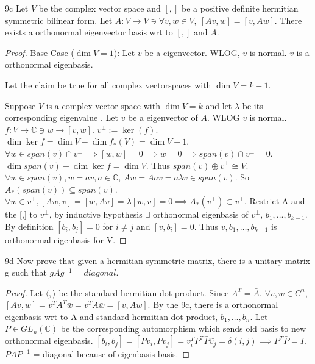 \documentclass{article}
\newcommand{\C}{\mathbb{C}}
\newcommand{\angles}[1]{\langle #1 \rangle}
\begin{document}
\begin{claim}{9c}\label{Claim 9c.}
    Let $V$ be the complex vector space and $[,]$ be a positive definite hermitian symmetric bilinear form. Let $A: V \to V \ni \forall v, w \in V,~ [Av, w] = [v, Aw]$. There exists a orthonormal eigenvector basis wrt to $[ , ]$ and $A$.     
\end{claim}
\begin{proof}
    Base Case ($\dim V = 1$): Let $v$ be a eigenvector. WLOG, $v$ is normal. $v$ is a orthonormal eigenbasis.
    
    Let the claim be true for all complex vectorspaces with $\dim V = k - 1$. 
    
    Suppose $V$ is a complex vector space with $\dim V = k$ and let $\lambda$ be its corresponding eigenvalue . Let $v$ be a eigenvector of $A$. WLOG $v$ is normal. $f : V \to \C \ni w \to [v, w]$. $v^\perp := \ker(f)$. $\dim \ker f = \dim V - \dim f_*(V) = \dim V - 1$. $\forall w \in span(v) \cap v^\perp \implies [w, w] = 0 \implies w = 0 \implies span(v) \cap v^\perp = 0$. $\dim span(v) + \dim \ker f = \dim V$. Thus $span(v) \oplus v^\perp \cong V$. $\forall w \in span(v), w = av, a \in \C$, $Aw = Aav = a\lambda v \in span(v)$. So $A_*(span(v)) \subseteq span(v)$. $\forall w \in v^\perp, [Aw, v] = [w, Av] = \lambda[w, v] = 0 \implies A_*(v^\perp) \subset v^\perp$. Restrict A and the [,] to $v^\perp$, by inductive hypothesis $\exists$ orthonormal eigenbasis of $v^\perp$, $b_1, \dots, b_{k - 1}$. By definition $[b_i, b_j] = 0$ for $i \neq j$ and $[v, b_i] = 0$. Thus $v, b_1, \dots, b_{k - 1}$ is orthonormal eigenbasis for V.            
\end{proof}

\begin{claim}{9d}\label{Claim 9d.}
    Now prove that given a hermitian symmetric matrix, there is a unitary matrix g such that $g A g^{-1} = diagonal$.
\end{claim}
\begin{proof}
    Let $\angles{ , }$ be the standard hermitian dot product. Since $A^T = \bar A$, $\forall v, w \in C^n$, $[Av, w] = v^T A^T \bar{w} = v^T \bar{A} \bar{w} = [v, Aw]$. By the 9c, there is a orthonormal eigenbasis wrt to A and standard hermitian dot product, $b_1, \dots, b_n$. Let $P \in GL_n(\C)$ be the corresponding automorphism which sends old basis to new orthonormal eigenbasis. $[b_i, b_j] = [Pv_i, Pv_j] = v_i^T P^T \bar{P} \bar{v_j} = \delta(i, j) \implies P^T \bar{P} = I$. $PAP^{-1}$ = diagonal because of eigenbasis basis.            
\end{proof}
\end{document}
